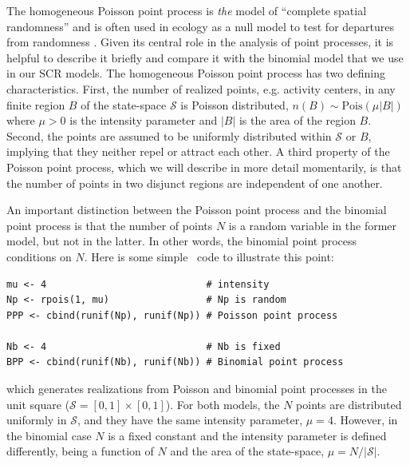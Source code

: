 The homogeneous Poisson point process is \textit{the} model of ``complete
spatial randomness'' and is often used in ecology as a null model
to test for departures from randomness
\citep{diggle:2003,illian_etal:2008}. Given its central role in the
analysis of point processes, it is helpful to describe it briefly and
compare it with the binomial model that we use in our SCR models. The
homogeneous Poisson point process has two defining
characteristics. First, the number of realized points, e.g. activity
centers, in any finite region $B$ of the state-space $\mathcal{S}$ is
Poisson distributed, $n(B) \sim \text{Pois}(\mu|B|)$ where $\mu>0$ is
the intensity parameter and $|B|$ is the area of the region
$B$. Second, the points are assumed to be
uniformly distributed within $\mathcal{S}$ or $B$, implying that they neither repel or attract
each other. A third property of the Poisson point process, which we
will describe in more detail momentarily, is that the number of points
in two disjunct regions are independent of one another.

An important distinction between the Poisson point process and the
binomial point process is that the number of points $N$ is a random
variable in the former model, but not in
the latter. In other words, the binomial point process conditions on $N$.
Here is some simple \R~code to illustrate this point:
\begin{verbatim}
mu <- 4                            # intensity
Np <- rpois(1, mu)                 # Np is random
PPP <- cbind(runif(Np), runif(Np)) # Poisson point process

Nb <- 4                            # Nb is fixed
BPP <- cbind(runif(Nb), runif(Nb)) # Binomial point process
\end{verbatim}
which generates realizations from Poisson and binomial point
processes in the unit square ($\mathcal{S} = [0,1]\times[0,1]$).
For both models, the $N$ points are
distributed uniformly
in $\mathcal{S}$, and they have the same intensity parameter,
$\mu=4$. However, in the binomial case $N$ is a fixed constant and the
intensity parameter is
defined differently, being a function of $N$ and the area of the
state-space, $\mu = N/|\mathcal{S}|$.

